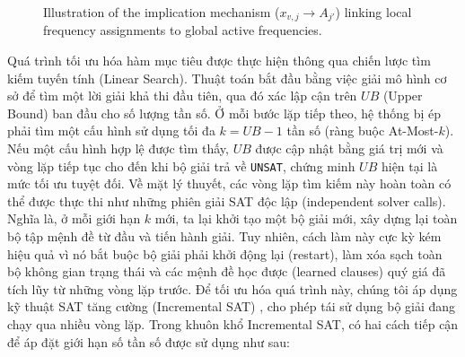 \documentclass[letterpaper,journal]{IEEEtran}
\begin{document}
\begin{figure}[htbp]
\caption{Illustration of the implication mechanism ($x_{v,j} \rightarrow A_{j'}$) linking local frequency assignments to global active frequencies.}
\label{fig:x_to_A_implication}
\end{figure}

Quá trình tối ưu hóa hàm mục tiêu được thực hiện thông qua chiến lược tìm kiếm tuyến tính (Linear Search). Thuật toán bắt đầu bằng việc giải mô hình cơ sở để tìm một lời giải khả thi đầu tiên, qua đó xác lập cận trên $UB$ (Upper Bound) ban đầu cho số lượng tần số. Ở mỗi bước lặp tiếp theo, hệ thống bị ép phải tìm một cấu hình sử dụng tối đa $k = UB - 1$ tần số (ràng buộc At-Most-$k$). Nếu một cấu hình hợp lệ được tìm thấy, $UB$ được cập nhật bằng giá trị mới và vòng lặp tiếp tục cho đến khi bộ giải trả về \texttt{UNSAT}, chứng minh $UB$ hiện tại là mức tối ưu tuyệt đối.
Về mặt lý thuyết, các vòng lặp tìm kiếm này hoàn toàn có thể được thực thi như những phiên giải SAT độc lập (independent solver calls). Nghĩa là, ở mỗi giới hạn $k$ mới, ta lại khởi tạo một bộ giải mới, xây dựng lại toàn bộ tập mệnh đề từ đầu và tiến hành giải. Tuy nhiên, cách làm này cực kỳ kém hiệu quả vì nó bắt buộc bộ giải phải khởi động lại (restart), làm xóa sạch toàn bộ không gian trạng thái và các mệnh đề học được (learned clauses) quý giá đã tích lũy từ những vòng lặp trước. Để tối ưu hóa quá trình này, chúng tôi áp dụng kỹ thuật SAT tăng cường (Incremental SAT) \cite{martins2014incremental}, cho phép tái sử dụng bộ giải đang chạy qua nhiều vòng lặp. Trong khuôn khổ Incremental SAT, có hai cách tiếp cận để áp đặt giới hạn số tần số được sử dụng như sau:
\end{document}
